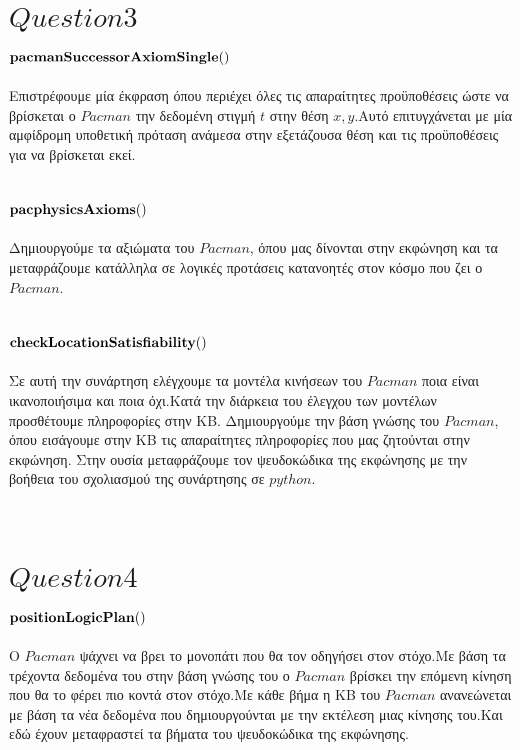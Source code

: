 \documentclass[10pt]{article}
\begin{document}
\section*{$Question 3$}
\vspace{5mm}
\underline{\underline{$\bf pacmanSuccessorAxiomSingle()$}} \\ \\
Επιστρέφουμε μία έκφραση όπου περιέχει όλες τις απαραίτητες προϋποθέσεις ώστε να βρίσκεται ο $Pacman$ την δεδομένη στιγμή $t$ στην θέση $x,y$.Αυτό επιτυγχάνεται με μία αμφίδρομη υποθετική πρόταση ανάμεσα στην εξετάζουσα θέση και τις προϋποθέσεις για να βρίσκεται εκεί. \\ \\ \\
\underline{\underline{$\bf pacphysicsAxioms()$}} \\ \\
Δημιουργούμε τα αξιώματα του $Pacman$, όπου μας δίνονται στην εκφώνηση και τα μεταφράζουμε κατάλληλα σε λογικές προτάσεις κατανοητές στον κόσμο που ζει ο $Pacman$. \\ \\ \\
\underline{\underline{$\bf checkLocationSatisfiability()$}} \\ \\
Σε αυτή την συνάρτηση ελέγχουμε τα μοντέλα κινήσεων του $Pacman$ ποια είναι ικανοποιήσιμα και ποια όχι.Κατά την διάρκεια του έλεγχου των μοντέλων προσθέτουμε πληροφορίες στην ΚΒ. Δημιουργούμε την βάση γνώσης του $Pacman$, όπου εισάγουμε στην ΚΒ τις απαραίτητες πληροφορίες που μας ζητούνται στην εκφώνηση. Στην ουσία μεταφράζουμε τον ψευδοκώδικα της εκφώνησης με την βοήθεια του σχολιασμού της συνάρτησης σε $python$.
\\ \\ \\
\section*{$Question 4$}
\vspace{5mm}
\underline{\underline{$\bf  positionLogicPlan()$}} \\ \\
Ο $Pacman$ ψάχνει να βρει το μονοπάτι που θα τον οδηγήσει στον στόχο.Με βάση τα τρέχοντα δεδομένα του στην βάση γνώσης του ο $Pacman$ βρίσκει την επόμενη κίνηση που θα το φέρει πιο κοντά στον στόχο.Με κάθε βήμα η ΚΒ του  $Pacman$ ανανεώνεται με βάση τα νέα δεδομένα που δημιουργούνται με την εκτέλεση μιας κίνησης του.Και εδώ έχουν μεταφραστεί τα βήματα του ψευδοκώδικα της εκφώνησης. 
\\ \\ \\
\end{document}
